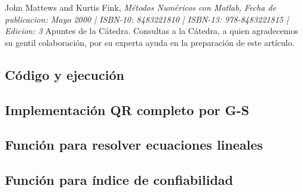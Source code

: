 \documentclass[10pt,journal,compsoc]{IEEEtran}
\begin{document}

%
%
%



\renewcommand{\refname}{Bibliograf\'ia}
\begin{thebibliography}{1}
John Mattews and Kurtis Fink, \emph{M\'etodos Num\'ericos con Matlab, Fecha de publicacion: Mayo 2000 | ISBN-10: 8483221810 | ISBN-13: 978-8483221815 | Edicion: 3}
 Apuntes de la C\'atedra.
 Consultas a la C\'atedra, a quien agradecemos su gentil colaboraci\'on, por su experta ayuda  en la preparaci\'on de este art\'iculo.

\end{thebibliography}


\newpage

\onecolumn

\renewcommand\appendixname{Ap\'endice}

\appendix
\subsection{C\'odigo y ejecuci\'on}

\subsection{Implementaci\'on QR completo por G-S}
 
\subsection{Funci\'on para resolver ecuaciones lineales}
 
\subsection{Funci\'on para \'indice de confiabilidad}
 
\end{document}
